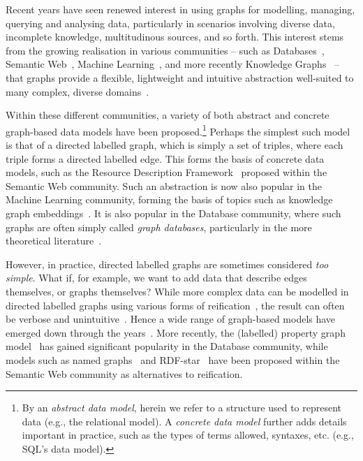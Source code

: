 Recent years have seen renewed interest in using graphs for modelling, managing, querying and analysing data, particularly in scenarios involving diverse data, incomplete knowledge, multitudinous sources, and so forth. This interest stems from the growing realisation in various communities -- such as Databases~\cite{Bonifati}, Semantic Web~\cite{Hitzler2010}, Machine Learning~\cite{Hamilton}, and more recently Knowledge Graphs~\cite{HoganBCdMGKGNNN21} -- that graphs provide a flexible, lightweight and intuitive abstraction well-suited to many complex, diverse domains~\cite{AnglesABBFGLPPS18}.

Within these different communities, a variety of both abstract and concrete graph-based data models have been proposed.\footnote{By an \textit{abstract data model}, herein we refer to a structure used to represent data (e.g., the relational model). A \textit{concrete data model} further adds details important in practice, such as the types of terms allowed, syntaxes, etc. (e.g., SQL's data model).} Perhaps the simplest such model is that of a directed labelled graph, which is simply a set of triples, where each triple forms a directed labelled edge. This forms the basis of concrete data models, such as the Resource Description Framework~\cite{CyganiakWL14} proposed within the Semantic Web community. Such an abstraction is now also popular in the Machine Learning community, forming the basis of topics such as knowledge graph embeddings~\cite{Wang2017KGEmbedding}. It is also popular in the Database community, where such graphs are often simply called \textit{graph databases}, particularly in the more theoretical literature~\cite{Wood12}.

However, in practice, directed labelled graphs are sometimes considered \textit{too simple}. What if, for example, we want to add data that describe edges themselves, or graphs themselves? While more complex data can be modelled in directed labelled graphs using various forms of reification~\cite{HernandezHK15}, the result can often be verbose and unintuitive~\cite{AnglesABBFGLPPS18}. Hence a wide range of graph-based models have emerged down through the years~\cite{AnglesG08}. More recently, the (labelled) property graph model~\cite{Webber12,AnglesABBFGLPPS18} has gained significant popularity in the Database community, while models such as named graphs~\cite{HarrisS13} and RDF-star~\cite{Hartig17} have been proposed within the Semantic Web community as alternatives to reification. 

